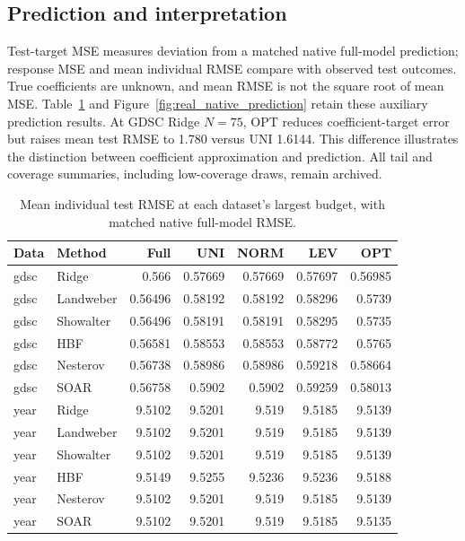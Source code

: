 \documentclass[11pt,a4paper,leqno]{article}
\numberwithin{equation}{section}
\numberwithin{figure}{section}
\numberwithin{table}{section}
\theoremstyle{plain}
\theoremstyle{definition}
\theoremstyle{remark}
\begin{document}
\subsection{Prediction and interpretation}
\label{supp:subsec:real_prediction}
Test-target MSE measures deviation from a matched native full-model
prediction; response MSE and mean individual RMSE compare with observed
test outcomes. True coefficients are unknown, and mean RMSE is not the
square root of mean MSE. Table~\ref{tab:real_prediction_compact} and
Figure~\ref{fig:real_native_prediction} retain these auxiliary prediction
results. At GDSC Ridge $N=75$, OPT reduces coefficient-target error but
raises mean test RMSE to 1.780 versus UNI 1.6144. This difference
illustrates the distinction between coefficient approximation and prediction.
All tail and coverage summaries, including low-coverage draws, remain archived.

\begin{table}[!htbp]\centering\small
\setlength{\tabcolsep}{4pt}
\caption{Mean individual test RMSE at each dataset's largest budget, with matched native full-model RMSE.}
\label{tab:real_prediction_compact}
\begin{tabular}{llrrrrr}\toprule
Data & Method & Full & UNI & NORM & LEV & OPT \\\midrule
gdsc & Ridge & 0.566 & 0.57669 & 0.57669 & 0.57697 & 0.56985 \\
gdsc & Landweber & 0.56496 & 0.58192 & 0.58192 & 0.58296 & 0.5739 \\
gdsc & Showalter & 0.56496 & 0.58191 & 0.58191 & 0.58295 & 0.5735 \\
gdsc & HBF & 0.56581 & 0.58553 & 0.58553 & 0.58772 & 0.5765 \\
gdsc & Nesterov & 0.56738 & 0.58986 & 0.58986 & 0.59218 & 0.58664 \\
gdsc & SOAR & 0.56758 & 0.5902 & 0.5902 & 0.59259 & 0.58013 \\
year & Ridge & 9.5102 & 9.5201 & 9.519 & 9.5185 & 9.5139 \\
year & Landweber & 9.5102 & 9.5201 & 9.519 & 9.5185 & 9.5139 \\
year & Showalter & 9.5102 & 9.5201 & 9.519 & 9.5185 & 9.5139 \\
year & HBF & 9.5149 & 9.5255 & 9.5236 & 9.5236 & 9.5188 \\
year & Nesterov & 9.5102 & 9.5201 & 9.519 & 9.5185 & 9.5139 \\
year & SOAR & 9.5102 & 9.5201 & 9.519 & 9.5185 & 9.5135 \\
\bottomrule\end{tabular}
\end{table}
\end{document}
